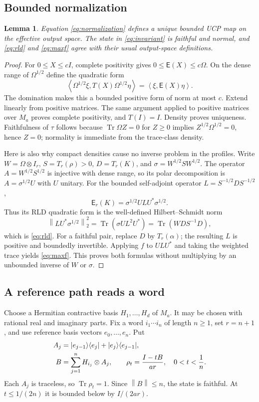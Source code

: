 \documentclass[11pt,reqno]{amsart}
\newtheorem{lemma}[theorem]{Lemma}
\theoremstyle{definition}
\theoremstyle{remark}
\numberwithin{equation}{section}
\DeclareMathOperator{\Tr}{Tr}
\newcommand{\E}{\mathsf E}
\newcommand{\norm}[1]{\left\lVert#1\right\rVert}
\newcommand{\ip}[2]{\left\langle#1,#2\right\rangle}
\begin{document}
\subsection{Bounded normalization}

\begin{lemma}\label{lem:bounded-normalization}
Equation \eqref{eq:normalization} defines a unique bounded UCP map on the effective output space. The state in \eqref{eq:invariant} is faithful and normal, and \eqref{eq:rld} and \eqref{eq:maxf} agree with their usual output-space definitions.
\end{lemma}

\begin{proof}
For $0\le X\le cI$, complete positivity gives $0\le\E(X)\le c\Omega$. On the dense range of $\Omega^{1/2}$ define the quadratic form
\[
 \ip{\Omega^{1/2}\xi}{T(X)\Omega^{1/2}\eta}
 =\ip{\xi}{\E(X)\eta}.
\]
The domination makes this a bounded positive form of norm at most $c$. Extend linearly from positive matrices. The same argument applied to positive matrices over $M_a$ proves complete positivity, and $T(I)=I$. Density proves uniqueness. Faithfulness of $\tau$ follows because $\Tr\Omega Z=0$ for $Z\ge0$ implies $Z^{1/2}\Omega^{1/2}=0$, hence $Z=0$; normality is immediate from the trace-class density.

Here is also why compact densities cause no inverse problem in the profiles. Write $W=\Omega\otimes I_r$, $S=T_r(\rho)>0$, $D=T_r(K)$, and $\sigma=W^{1/2}SW^{1/2}$. The operator $A=W^{1/2}S^{1/2}$ is injective with dense range, so its polar decomposition is $A=\sigma^{1/2}U$ with $U$ unitary. For the bounded self-adjoint operator $L=S^{-1/2}DS^{-1/2}$,
\[
 \E_r(K)=\sigma^{1/2}ULU^*\sigma^{1/2}.
\]
Thus its RLD quadratic form is the well-defined Hilbert--Schmidt norm
\[
 \norm{LU^*\sigma^{1/2}}_2^2
 =\Tr(\sigma UL^2U^*)=\Tr(WDS^{-1}D),
\]
which is \eqref{eq:rld}. For a faithful pair, replace $D$ by $T_r(\alpha)$; the resulting $L$ is positive and boundedly invertible. Applying $f$ to $ULU^*$ and taking the weighted trace yields \eqref{eq:maxf}. This proves both formulas without multiplying by an unbounded inverse of $W$ or $\sigma$.
\end{proof}

\subsection{A reference path reads a word}

Choose a Hermitian contractive basis $H_1,\ldots,H_d$ of $M_a$. It may be chosen with rational real and imaginary parts. Fix a word $i_1\cdots i_n$ of length $n\ge1$, set $r=n+1$, and use reference basis vectors $e_0,\ldots,e_n$. Put
\begin{align}
 A_j&=|e_{j-1}\rangle\langle e_j|+|e_j\rangle\langle e_{j-1}|,\notag\\
 B&=\sum_{j=1}^nH_{i_j}\otimes A_j,\qquad
 \rho_t=\frac{I-tB}{ar},\quad 0<t<\frac1n.\label{eq:path-state}
\end{align}
Each $A_j$ is traceless, so $\Tr\rho_t=1$. Since $\norm B\le n$, the state is faithful. At $t\le1/(2n)$ it is bounded below by $I/(2ar)$.
\end{document}

